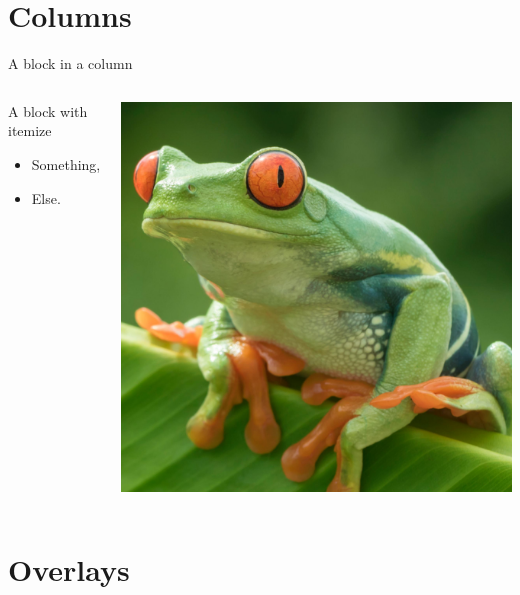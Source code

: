 \documentclass[10pt,a4paper, dvipsnames]{beamer}
\begin{document}
\section{Columns}
  \begin{frame}{A block in a column}
     \begin{columns}[c]
     \begin{block}{A block with itemize}
       \begin{itemize}
         \item Something,
         \item Else.
       \end{itemize}
     \end{block}
     \includegraphics[width=\columnwidth]{images/frog.jpeg}
     \end{columns}
\end{frame}

\section{Overlays}
\end{document}
